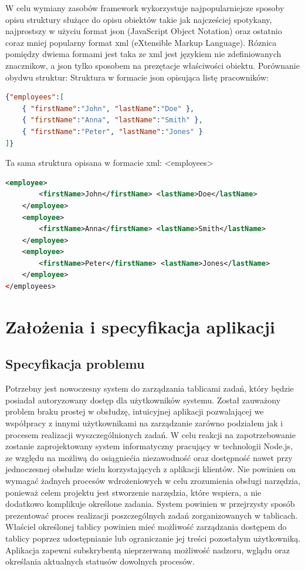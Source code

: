 \documentclass[12pt]{report}
\begin{document}
W celu wymiany zasobów framework wykorzystuje najpopularniejsze sposoby opisu struktury służące do opisu obiektów takie jak najcześciej spotykany, najprostszy w użyciu format json (JavaScript Object Notation) oraz ostatnio coraz mniej popularny format xml (eXtensible Markup Language). 
Róznica pomiędzy dwiema formami jest taka ze xml jest językiem nie zdefiniowanych znacznikow, a json tylko sposobem na prezętacje właściwości obiektu. 
Porównanie obydwu struktur:
Struktura w formacie json opisująca listę pracowników:
\begin{lstlisting}[language=json,firstnumber=1]
{"employees":[
	{ "firstName":"John", "lastName":"Doe" },
	{ "firstName":"Anna", "lastName":"Smith" },
	{ "firstName":"Peter", "lastName":"Jones" }
]}
\end{lstlisting}

Ta sama struktura opisana w formacie xml:
<employees>
\begin{lstlisting}[language=XML,firstnumber=1]
	<employee>
		<firstName>John</firstName> <lastName>Doe</lastName>
	</employee>
	<employee>
		<firstName>Anna</firstName> <lastName>Smith</lastName>
	</employee>
	<employee>
		<firstName>Peter</firstName> <lastName>Jones</lastName>
	</employee>
</employees>
\end{lstlisting}


\chapter{Założenia i specyfikacja aplikacji}

\section{Specyfikacja problemu}
Potrzebny jest nowoczesny system do zarządzania tablicami zadań, który będzie posiadał autoryzowany dostęp dla użytkowników systemu. 
Został zauważony problem braku prostej w obsłudzę, intuicyjnej aplikacji pozwalającej we współpracy z innymi użytkownikami na zarządzanie zarówno podziałem jak i procesem realizacji wyszczególnionych zadań.
W celu reakcji na zapotrzebowanie zostanie zaprojektowany system informatyczny pracujący w technologii Node.js, ze względu na możliwą do osiągniećia niezawodność oraz dostępność nawet przy jednoczesnej obsłudze wielu korzystających z aplikacji klientów.
Nie powinien on wymagać żadnych procesów wdrożeniowych w celu zrozumienia obsługi narzędzia, ponieważ celem projektu jest stworzenie narzędzia, które wspiera, a nie dodatkowo komplikuje określone zadania.
System powinien w przejrzysty sposób prezentować proces realizacji poszczególnych zadań zorganizowanych w tablicach.
Właściel określonej tablicy powinien mieć możliwość zarządzania dostępem do tablicy poprzez udostępnianie lub ograniczanie jej treści pozostałym użytkowniką.
Aplikacja zapewni subskrybentą nieprzerwaną możliwość nadzoru, wglądu oraz określania aktualnych statusów dowolnych procesów.
\end{document}
